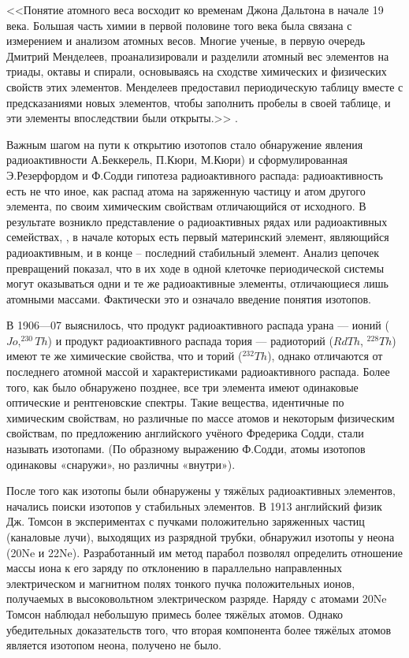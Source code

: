 \documentclass[a5paper,openany]{book}
\begin{document}
<<Понятие атомного веса восходит ко временам Джона Дальтона в начале 19 века. Большая часть химии в первой половине того века была связана с измерением и анализом атомных весов. Многие ученые, в первую очередь Дмитрий Менделеев, проанализировали и разделили атомный вес элементов на триады, октавы и спирали, основываясь на сходстве химических и физических свойств этих элементов. Менделеев предоставил периодическую таблицу вместе с предсказаниями новых элементов, чтобы заполнить пробелы в своей таблице, и эти элементы впоследствии были открыты.>>  \cite{IUPACIntervalHistory}.  

Важным шагом на пути к открытию изотопов стало обнаружение явления радиоактивности
А.Беккерель, П.Кюри, М.Кюри) и сформулированная Э.Резерфордом и Ф.Содди 
гипотеза радиоактивного распада: радиоактивность есть не что иное, как распад атома на заряженную
частицу и атом другого элемента, по своим химическим свойствам отличающийся от исходного. В
результате возникло представление о радиоактивных рядах или радиоактивных семействах, , 
в начале
которых есть первый материнский элемент, являющийся радиоактивным, и в конце – последний
стабильный элемент. Анализ цепочек превращений показал, что в их ходе в одной клеточке
периодической системы могут оказываться одни и те же радиоактивные элементы, отличающиеся лишь
атомными массами. Фактически это и означало введение понятия изотопов. 

В 1906—07 выяснилось, что продукт радиоактивного распада урана — ионий ($Jo, ^{230}Th$) и
продукт радиоактивного распада тория — радиоторий ($RdTh$, $^{228}Th$) имеют те же химические свойства,
что и торий ($^{232}Th$), однако отличаются от последнего атомной массой и характеристиками
радиоактивного распада. Более того, как было обнаружено позднее, все три элемента имеют
одинаковые оптические и рентгеновские спектры. Такие вещества, идентичные по химическим
свойствам, но различные по массе атомов и некоторым физическим свойствам, по предложению
английского учёного Фредерика Содди, стали называть изотопами. (По образному выражению
Ф.Содди, атомы изотопов одинаковы «снаружи», но различны «внутри»). 

После того как изотопы были обнаружены у тяжёлых радиоактивных элементов, начались поиски
изотопов у стабильных элементов. В 1913 английский физик Дж. Томсон в экспериментах с пучками
положительно заряженных частиц (каналовые лучи), выходящих из разрядной трубки, обнаружил
изотопы у неона (20Ne и 22Ne). Разработанный им метод парабол позволял определить отношение массы
иона к его заряду по отклонению в параллельно направленных электрическом и магнитном полях
тонкого пучка положительных ионов, получаемых в высоковольтном электрическом разряде. Наряду с
атомами 20Ne Томсон наблюдал небольшую примесь более тяжёлых атомов. Однако убедительных
доказательств того, что вторая компонента более тяжёлых атомов является изотопом неона, получено не
было. 
\end{document}
